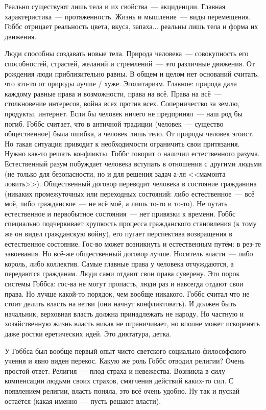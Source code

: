 Реально существуют лишь тела и их свойства~--- акциденции. Главная характеристика~--- протяженность. Жизнь и мышление~--- виды перемещения. Гоббс отрицает реальность цвета, вкуса, запаха... реальны лишь тела и форма их движения.

Люди способны создавать новые тела. Природа человека~--- совокупность его способностей, страстей, желаний и стремлений~--- это различные движения. От рождения люди приблизительно равны. В общем и целом нет оснований считать, что кто-то от природы лучше / хуже. Эголитаризм. Главное: природа дала каждому равные права и возможности, права на всё. Права на всё~--- столкновение интересов, война всех против всех. Соперничество за землю, продукты, интернет. Если бы человек ничего не предпринял~--- наш род бы погиб. Гоббс считает, что в античной традиции (человек~--- существо общественное) была ошибка, а человек лишь тело. От природы человек эгоист. Но такая ситуация приводит к необходимости ограничить свои притязания. Нужно как-то решать конфликты. Гоббс говорит о наличии естественного разума. Естественный разум побуждает человека вступать в отношения с другими людьми (не только для безопасности, но и для решения задач а-ля <<мамонта ловить>>). Общественный договор переводит человека в состояние гражданина (никаких промежуточных или переходных состояний: либо естественное~--- всё моё, либо гражданское~--- не всё моё, а лишь то-то и то-то). Не путать естественное и первобытное состояния~--- нет привязки к времени. Гоббс специально подчеркивает хрупкость процесса гражданского становления (к тому же он видел гражданскую войну), его пугает перспектива возвращения в естественное состояние. Гос-во может возникнуть и естественным путём: в рез-те завоевания. Но всё-же общественный договор лучше. Носитель власти~--- либо король, либо коллектив. Самые главные права у человека отчуждаются, а передаются гражданам. Люди сами отдают свои права суверену. Это порок системы Гоббса: гос-ва не могут пропасть, люди раз и навсегда отдают свои права. Но лучше какой-то порядок, чем вообще никакого. Гоббс считал что не стоит делить власть на ветви (они начнут конфликтовать). И должен быть начальник, верховная власть должна принадлежать не народу. Но частную и хозяйственную жизнь власть никак не ограничивает, но вполне может искоренять даже ростки еретических идей. Это диктатура, детка.

У Гоббса был вообще первый опыт чисто светского социально-философского учения и явно виден перекос. Какую же роль Гоббс отводил религии? Очень простой ответ. Религия~--- плод страха и невежества. Возникла в силу компенсации людьми своих страхов, смягчения действий каких-то сил. С появлением религии, власть поняла, это всё очень удобно. Ну так и пускай остаётся (какая именно~--- пусть решают власти).

